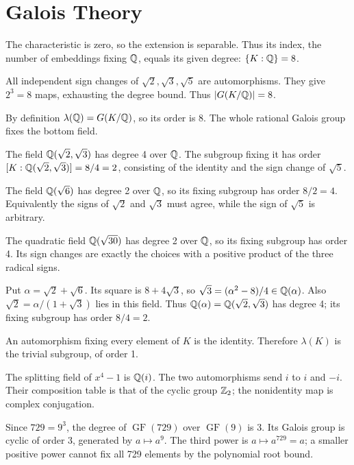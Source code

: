 \section{Galois Theory}

The characteristic is zero, so the extension is separable. Thus its index, the number of embeddings fixing $\mathbb{Q}$, equals its given degree: $\{K:\mathbb{Q}\}=8$.

All independent sign changes of $\sqrt2,\sqrt3,\sqrt5$ are automorphisms. They give $2^3=8$ maps, exhausting the degree bound. Thus $|G(K/\mathbb{Q})|=8$.

By definition $\lambda(\mathbb{Q})=G(K/\mathbb{Q})$, so its order is 8. The whole rational Galois group fixes the bottom field.

The field $\mathbb{Q}(\sqrt2,\sqrt3)$ has degree 4 over $\mathbb{Q}$. The subgroup fixing it has order $[K:\mathbb{Q}(\sqrt2,\sqrt3)]=8/4=2$, consisting of the identity and the sign change of $\sqrt5$.

The field $\mathbb{Q}(\sqrt6)$ has degree 2 over $\mathbb{Q}$, so its fixing subgroup has order $8/2=4$. Equivalently the signs of $\sqrt2$ and $\sqrt3$ must agree, while the sign of $\sqrt5$ is arbitrary.

The quadratic field $\mathbb{Q}(\sqrt{30})$ has degree 2 over $\mathbb{Q}$, so its fixing subgroup has order 4. Its sign changes are exactly the choices with a positive product of the three radical signs.

Put $\alpha=\sqrt2+\sqrt6$. Its square is $8+4\sqrt3$, so $\sqrt3=(\alpha^2-8)/4\in\mathbb{Q}(\alpha)$. Also $\sqrt2=\alpha/(1+\sqrt3)$ lies in this field. Thus $\mathbb{Q}(\alpha)=\mathbb{Q}(\sqrt2,\sqrt3)$ has degree 4; its fixing subgroup has order $8/4=2$.

An automorphism fixing every element of $K$ is the identity. Therefore $\lambda(K)$ is the trivial subgroup, of order 1.

The splitting field of $x^4-1$ is $\mathbb{Q}(i)$. The two automorphisms send $i$ to $i$ and $-i$. Their composition table is that of the cyclic group $\mathbb{Z}_2$; the nonidentity map is complex conjugation.

Since $729=9^3$, the degree of $\operatorname{GF}(729)$ over $\operatorname{GF}(9)$ is 3. Its Galois group is cyclic of order 3, generated by $a\mapsto a^9$. The third power is $a\mapsto a^{729}=a$; a smaller positive power cannot fix all 729 elements by the polynomial root bound.


